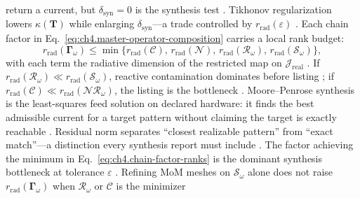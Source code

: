 return a current, but \(\delta_{\mathrm{syn}}=0\) is the synthesis test \cite{hansen1988}. Tikhonov
regularization lowers \(\kappa(\mathbf{T})\) while enlarging \(\delta_{\mathrm{syn}}\)---a trade controlled by
\(r_{\mathrm{rad}}(\varepsilon)\) \cite{devaney2004}.
Each chain factor in Eq.~\eqref{eq:ch4.master-operator-composition} carries a local rank budget:
\begin{equation}
\label{eq:ch4.chain-factor-ranks}
r_{\mathrm{rad}}(\boldsymbol{\Gamma}_\omega)
\le
\min\big\{
r_{\mathrm{rad}}(\mathcal{C}),\,
r_{\mathrm{rad}}(\mathcal{N}),\,
r_{\mathrm{rad}}(\mathcal{R}_\omega),\,
r_{\mathrm{rad}}(\mathcal{S}_\omega)
\big\},
\end{equation}
with each term the radiative dimension of the restricted map on \(\mathcal{J}_{\mathrm{real}}\) \cite{stratton1941}.
If \(r_{\mathrm{rad}}(\mathcal{R}_\omega)\ll r_{\mathrm{rad}}(\mathcal{S}_\omega)\), reactive contamination
dominates before listing \cite{harrington2001}; if \(r_{\mathrm{rad}}(\mathcal{C})\ll r_{\mathrm{rad}}(\mathcal{N}\mathcal{R}_\omega)\),
the listing is the bottleneck \cite{hansen1988}.
Moore--Penrose synthesis is the least-squares feed solution on declared hardware: it finds the best admissible current for a target pattern without claiming the target is exactly reachable \cite{harrington2001}. Residual norm separates ``closest realizable pattern'' from ``exact match''---a distinction every synthesis report must include \cite{stratton1941}.
\label{cor:ch4.chain-bottleneck}
The factor achieving the minimum in Eq.~\eqref{eq:ch4.chain-factor-ranks} is the dominant synthesis bottleneck at
tolerance \(\varepsilon\) \cite{harrington2001}. Refining MoM meshes on \(\mathcal{S}_\omega\) alone
does not raise \(r_{\mathrm{rad}}(\boldsymbol{\Gamma}_\omega)\) when \(\mathcal{R}_\omega\) or \(\mathcal{C}\) is the minimizer
